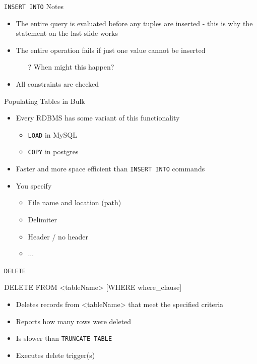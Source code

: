 \documentclass[aspectratio=169]{beamer}
\begin{document}
\begin{frame}{\texttt{INSERT INTO} Notes}

\begin{itemize}
\item The entire query is evaluated before any tuples are inserted - this is why the statement on the last slide works
\item The entire operation fails if just one value cannot be inserted
\begin{itemize}
\item[?] When might this happen? %
\end{itemize}
\item All constraints are checked

\end{itemize}
\end{frame}

\begin{frame}{Populating Tables in Bulk}

\begin{itemize}
\item Every RDBMS has some variant of this functionality
\begin{itemize}
\item \texttt{LOAD} in MySQL
\item \texttt{COPY} in postgres
\end{itemize}
\item Faster and more space efficient than \texttt{INSERT INTO} commands
\item You specify
\begin{itemize}
\item File name and location (path)
\item Delimiter
\item Header / no header
\item $\dots$
\end{itemize}
\end{itemize}

\end{frame}

\begin{frame}[fragile]{\texttt{DELETE}}

\begin{SQL}
DELETE FROM <tableName>
   [WHERE where_clause]
\end{SQL}

\begin{itemize}
\item Deletes records from <tableName> that meet the specified criteria
\item Reports how many rows were deleted
\item Is slower than \texttt{TRUNCATE TABLE}
\item Executes delete trigger(s)
\end{itemize}
\end{frame}
\end{document}
